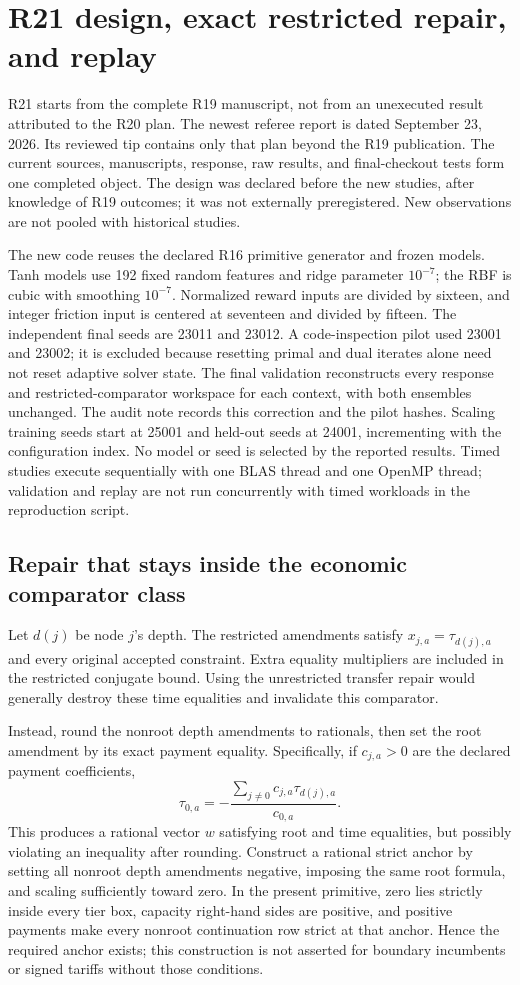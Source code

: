 \section{R21 design, exact restricted repair, and replay}\label{ec:r21-details}
R21 starts from the complete R19 manuscript, not from an unexecuted result attributed to the R20 plan. The newest referee report is dated September 23, 2026. Its reviewed tip contains only that plan beyond the R19 publication. The current sources, manuscripts, response, raw results, and final-checkout tests form one completed object. The design was declared before the new studies, after knowledge of R19 outcomes; it was not externally preregistered. New observations are not pooled with historical studies.

The new code reuses the declared R16 primitive generator and frozen models. Tanh models use 192 fixed random features and ridge parameter $10^{-7}$; the RBF is cubic with smoothing $10^{-7}$. Normalized reward inputs are divided by sixteen, and integer friction input is centered at seventeen and divided by fifteen. The independent final seeds are 23011 and 23012. A code-inspection pilot used 23001 and 23002; it is excluded because resetting primal and dual iterates alone need not reset adaptive solver state. The final validation reconstructs every response and restricted-comparator workspace for each context, with both ensembles unchanged. The audit note records this correction and the pilot hashes. Scaling training seeds start at 25001 and held-out seeds at 24001, incrementing with the configuration index. No model or seed is selected by the reported results. Timed studies execute sequentially with one BLAS thread and one OpenMP thread; validation and replay are not run concurrently with timed workloads in the reproduction script.

\subsection{Repair that stays inside the economic comparator class}
Let $d(j)$ be node $j$'s depth. The restricted amendments satisfy $x_{j,a}=\tau_{d(j),a}$ and every original accepted constraint. Extra equality multipliers are included in the restricted conjugate bound. Using the unrestricted transfer repair would generally destroy these time equalities and invalidate this comparator.

Instead, round the nonroot depth amendments to rationals, then set the root amendment by its exact payment equality. Specifically, if $c_{j,a}>0$ are the declared payment coefficients,
\[
 \tau_{0,a}=-\frac{\sum_{j\ne0}c_{j,a}\tau_{d(j),a}}{c_{0,a}}.
\]
This produces a rational vector $w$ satisfying root and time equalities, but possibly violating an inequality after rounding. Construct a rational strict anchor by setting all nonroot depth amendments negative, imposing the same root formula, and scaling sufficiently toward zero. In the present primitive, zero lies strictly inside every tier box, capacity right-hand sides are positive, and positive payments make every nonroot continuation row strict at that anchor. Hence the required anchor exists; this construction is not asserted for boundary incumbents or signed tariffs without those conditions.

